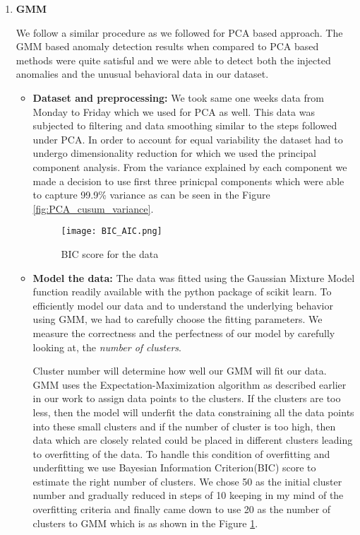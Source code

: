 \begin{enumerate}
\item\textbf{GMM}

We follow a similar procedure as we followed for PCA based approach. The GMM based anomaly detection results when compared to PCA based methods were quite satisful and we were able to detect both the injected anomalies and the unusual behavioral data in our dataset.

\begin{itemize}
\item\textbf{Dataset and preprocessing:} We took same one weeks data from Monday to Friday which we used for PCA as well. This data was subjected to filtering and data smoothing similar to the steps followed under PCA. In order to account for equal variability the dataset had to undergo dimensionality reduction for which we used the principal component analysis. From the variance explained by each component we made a decision to use first three prinicpal components which were able to capture 99.9\% variance as can be seen in the Figure \ref{fig:PCA_cusum_variance}.

\begin{figure}
\centerline{\texttt{[image: BIC\_AIC.png]}}
    \caption{BIC score for the data}
    \label{fig:bic}
\end{figure}

\item\textbf{Model the data:} The data was fitted using the Gaussian Mixture Model function readily available with the python package of scikit learn. To efficiently model our data and to understand the underlying behavior using GMM, we had to carefully choose the fitting parameters. We measure the correctness and the perfectness of our model by carefully looking at,  the \textit{number of clusters}. 

Cluster number will determine how well our GMM will fit our data. GMM uses the Expectation-Maximization algorithm as described earlier in our work to assign data points to the clusters. If the clusters are too less, then the model will underfit the data constraining all the data points into these small clusters and if the number of cluster is too high, then data which are closely related could be placed in different clusters leading to overfitting of the data. To handle this condition of overfitting and underfitting we use Bayesian Information Criterion(BIC) score to estimate the right number of clusters. We chose 50 as the initial cluster number and gradually reduced in steps of 10 keeping in my mind of the overfitting criteria and finally came down to use 20 as the number of clusters to GMM which is as shown in the Figure \ref{fig:bic}.


\end{itemize}
\end{enumerate}
